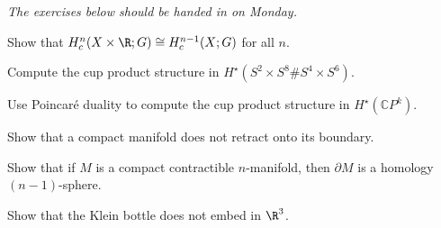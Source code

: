 \documentclass[12pt]{pset}
\author{Jim Fowler}
\date{Spring 2012}
\newcommand{\CP}{\mathbb{C}P}
\begin{document}
\maketitle

\textit{The exercises below should be handed in on Monday.}

\begin{problem}
Show that $H^n_c(X \times \R;G) \cong H_c^{n-1}(X;G)$ for all $n$.
\end{problem}

\begin{problem}
  Compute the cup product structure in $H^\star(S^2 \times S^8 \# S^4
  \times S^6)$.
\end{problem}

\begin{problem}
  Use Poincar\'e duality to compute the cup product structure in
  $H^\star(\CP^k)$.
\end{problem}

\begin{problem}
  Show that a compact manifold does not retract onto its boundary.
\end{problem}

\begin{problem}
  Show that if $M$ is a compact contractible $n$-manifold, then
  $\partial M$ is a homology $(n-1)$-sphere.
\end{problem}

\begin{problem}
  Show that the Klein bottle does not embed in $\R^3$.
\end{problem}
\end{document}
